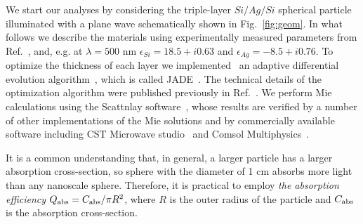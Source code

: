 \documentclass[aps,prl,twocolumn,showpacs,superscriptaddress,groupedaddress]{revtex4-1}
\begin{document}
We start our analyses by considering the triple-layer $Si/Ag/Si$
spherical particle illuminated with a plane wave schematically shown
in Fig.~\ref{fig:geom}. In what follows we describe the materials
using experimentally measured parameters from Ref.~\cite{palik-1997},
and, e.g. at $\lambda = 500$ nm $\epsilon_{Si} = 18.5 + i0.63$ and
$\epsilon_{Ag} = -8.5 + i0.76$.  To optimize the thickness of each
layer we implemented~\cite{JADE-web} an adaptive differential
evolution algorithm~\cite{Storn-DE-first-1997}, which is called
JADE~\cite{Jingqiao-JADE-2009}.  The technical details of the
optimization algorithm were published previously in
Ref.~\cite{Ladutenko-2014}. We perform Mie calculations using the
Scattnlay software~\cite{Pena-scattnlay-2009,Scattnlay-web}, whose
results are verified by a number of other implementations of the Mie
solutions and by commercially available software including CST
Microwave studio~\cite{CST-web} and Comsol
Multiphysics~\cite{Comsol-web}.

It is a common understanding that, in general, a larger particle has a
larger absorption cross-section, so sphere with the diameter of 1 cm
absorbs more light than any nanoscale sphere. Therefore, it is
practical to employ {\em the absorption efficiency} $Q_{\rm
  abs}=C_{\rm abs}/\pi R^2$, where $R$ is the outer radius of the
particle and $C_{\rm abs}$ is the absorption cross-section.
\end{document}
